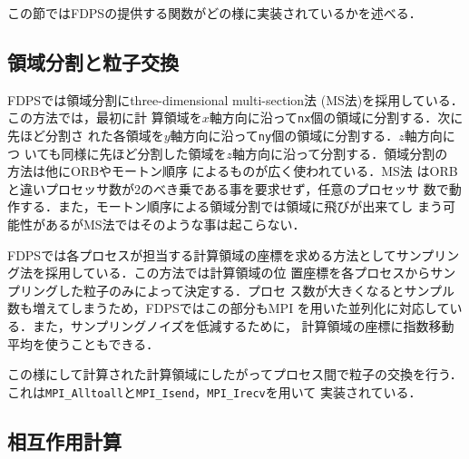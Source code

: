 \documentclass[submit,techreq,noauthor]{ipsj}
\begin{document}
この節ではFDPSの提供する関数がどの様に実装されているかを述べる．

\subsection{領域分割と粒子交換}

FDPSでは領域分割にthree-dimensional multi-section法
(MS法)\cite{2004PASJ...56..521M}を採用している．この方法では，最初に計
算領域を$x$軸方向に沿って{\tt nx}個の領域に分割する．次に先ほど分割さ
れた各領域を$y$軸方向に沿って{\tt ny}個の領域に分割する．$z$軸方向につ
いても同様に先ほど分割した領域を$z$軸方向に沿って分割する．領域分割の
方法は他にORB\cite{Blackston:1997:HPE:509593.509597}やモートン順序
\cite{Warren:1993:PHO:169627.169640}によるものが広く使われている．MS法
はORBと違いプロセッサ数が2のべき乗である事を要求せず，任意のプロセッサ
数で動作する．また，モートン順序による領域分割では領域に飛びが出来てし
まう可能性があるがMS法ではそのような事は起こらない．


FDPSでは各プロセスが担当する計算領域の座標を求める方法としてサンプリン
グ法\cite{2004PASJ...56..521M}を採用している．この方法では計算領域の位
置座標を各プロセスからサンプリングした粒子のみによって決定する．プロセ
ス数が大きくなるとサンプル数も増えてしまうため，FDPSではこの部分もMPI
を用いた並列化に対応している．また，サンプリングノイズを低減するために，
計算領域の座標に指数移動平均を使うこともできる．


この様にして計算された計算領域にしたがってプロセス間で粒子の交換を行う．
これは{\tt MPI\_Alltoall}と{\tt MPI\_Isend}，{\tt MPI\_Irecv}を用いて
実装されている．



\subsection{相互作用計算}
\end{document}
